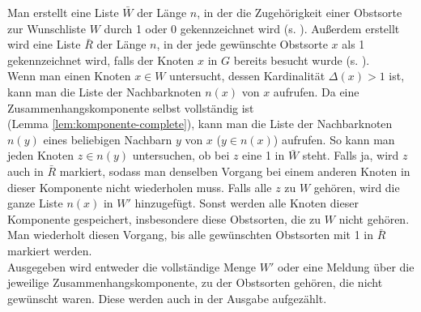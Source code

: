 Man erstellt eine Liste $\bar{W}$ der Länge $n$,
in der die Zugehörigkeit einer Obstsorte zur Wunschliste $W$ durch 1 oder 0 gekennzeichnet wird
(s. ). Außerdem erstellt wird eine Liste $\bar{R}$ der Länge $n$,
in der jede gewünschte Obstsorte $x$ als 1 gekennzeichnet wird, falls der Knoten $x$ in $G$ bereits
besucht wurde (s. ).\\

Wenn man einen Knoten $x \in W$ untersucht, dessen Kardinalität $\Delta(x) > 1$ ist,
kann man die Liste der Nachbarknoten $n(x)$ von $x$ aufrufen.
Da eine Zusammenhangskomponente selbst vollständig ist\\ (Lemma \ref{lem:komponente-complete}),
kann man die Liste der Nachbarknoten $n(y)$ eines beliebigen Nachbarn $y$ von $x$ ($y \in n(x)$) aufrufen.
So kann man jeden Knoten $z \in n(y)$ untersuchen, ob bei $z$ eine 1 in $\bar{W}$ steht.
Falls ja, wird $z$ auch in $\bar{R}$ markiert,
sodass man denselben Vorgang bei einem anderen Knoten in dieser Komponente nicht wiederholen muss.
Falls alle $z$ zu $W$ gehören, wird
die ganze Liste $n(x)$ in $W'$ hinzugefügt. Sonst werden alle Knoten dieser Komponente 
gespeichert, insbesondere diese Obstsorten, die zu $W$ nicht gehören.\\
Man wiederholt diesen Vorgang, bis alle gewünschten Obstsorten mit 1 in $\bar{R}$ markiert werden.\\

Ausgegeben wird entweder die vollständige Menge $W'$ oder eine Meldung über die jeweilige 
Zusammenhangskomponente, zu der Obstsorten gehören, die nicht gewünscht waren.
Diese werden auch in der Ausgabe aufgezählt.
